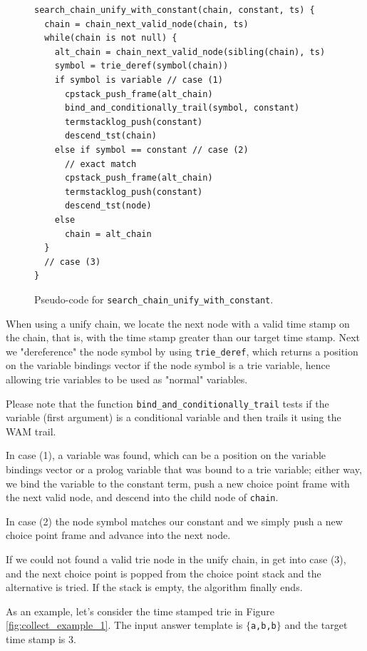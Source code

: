 \begin{figure}[ht]
\begin{Verbatim}
search_chain_unify_with_constant(chain, constant, ts) {
  chain = chain_next_valid_node(chain, ts)
  while(chain is not null) {
    alt_chain = chain_next_valid_node(sibling(chain), ts)
    symbol = trie_deref(symbol(chain))
    if symbol is variable // case (1)
      cpstack_push_frame(alt_chain)
      bind_and_conditionally_trail(symbol, constant)
      termstacklog_push(constant)
      descend_tst(chain)
    else if symbol == constant // case (2)
      // exact match
      cpstack_push_frame(alt_chain)
      termstacklog_push(constant)
      descend_tst(node)
    else
      chain = alt_chain
  }
  // case (3)
}
\end{Verbatim}
\caption{Pseudo-code for \texttt{search\_chain\_unify\_with\_constant}.}
\label{fig:search_chain_unify_with_constant}
\end{figure}

When using a unify chain, we locate the next node with a valid time stamp on the chain, that is,
with the time stamp greater than our target time stamp. Next we "dereference" the node symbol by using
\texttt{trie\_deref}, which returns a position on the variable bindings vector if the node symbol
is a trie variable, hence allowing trie variables to be used as "normal" variables.

Please note that the function \texttt{bind\_and\_conditionally\_trail} tests if the variable (first argument) is a conditional variable and then trails it using the WAM trail.

In case (1), a variable was found, which can be a position on the variable bindings vector or a prolog variable that was bound to a trie variable; either way, we bind the variable to the constant term, push a new choice point frame with the next valid node, and descend into the child node of \texttt{chain}.

In case (2) the node symbol matches our constant and we simply push a new choice point frame and advance into the next node.

If we could not found a valid trie node in the unify chain, in get into case (3), and the next choice point
is popped from the choice point stack and the alternative is tried. If the stack is empty, the algorithm finally ends.

As an example, let's consider the time stamped trie in Figure \ref{fig:collect_example_1}. The input answer template is $\{$\texttt{a,b,b}$\}$ and the target time stamp is 3.

